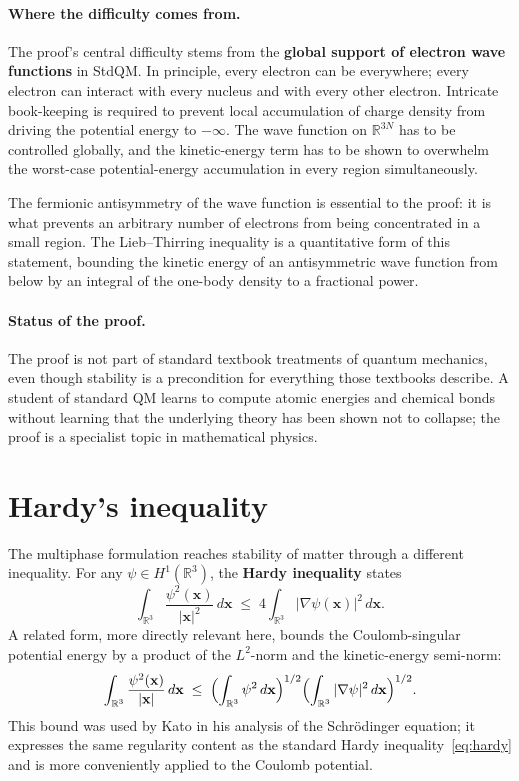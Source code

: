 \paragraph{Where the difficulty comes from.}
The proof's central difficulty stems from the \textbf{global support of electron wave functions} in StdQM. In principle, every electron can be everywhere; every electron can interact with every nucleus and with every other electron. Intricate book-keeping is required to prevent local accumulation of charge density from driving the potential energy to $-\infty$. The wave function on $\mathbb{R}^{3N}$ has to be controlled globally, and the kinetic-energy term has to be shown to overwhelm the worst-case potential-energy accumulation in every region simultaneously.

The fermionic antisymmetry of the wave function is essential to the proof: it is what prevents an arbitrary number of electrons from being concentrated in a small region. The Lieb--Thirring inequality is a quantitative form of this statement, bounding the kinetic energy of an antisymmetric wave function from below by an integral of the one-body density to a fractional power.

\paragraph{Status of the proof.}
The proof is not part of standard textbook treatments of quantum mechanics, even though stability is a precondition for everything those textbooks describe. A student of standard QM learns to compute atomic energies and chemical bonds without learning that the underlying theory has been shown not to collapse; the proof is a specialist topic in mathematical physics.

\section{Hardy's inequality}\label{sec:hardy}

The multiphase formulation reaches stability of matter through a different inequality. For any $\psi \in H^1(\mathbb{R}^3)$, the \textbf{Hardy inequality} states
\begin{equation}\label{eq:hardy}
\int_{\mathbb{R}^3} \frac{\psi^2(\mathbf{x})}{|\mathbf{x}|^2}\, d\mathbf{x}
\;\le\; 4 \int_{\mathbb{R}^3} |\nabla \psi(\mathbf{x})|^2\, d\mathbf{x}.
\end{equation}
A related form, more directly relevant here, bounds the Coulomb-singular potential energy by a product of the $L^2$-norm and the kinetic-energy semi-norm:
\begin{equation}\label{eq:hardy-kato}
\int_{\mathbb{R}^3} \frac{\psi^2(\mathbf{x})}{|\mathbf{x}|}\, d\mathbf{x}
\;\le\;
\Bigl(\int_{\mathbb{R}^3} \psi^2\, d\mathbf{x}\Bigr)^{1/2}
\Bigl(\int_{\mathbb{R}^3} |\nabla \psi|^2\, d\mathbf{x}\Bigr)^{1/2}.
\end{equation}
This bound was used by Kato in his analysis of the Schr\"odinger equation; it expresses the same regularity content as the standard Hardy inequality~\eqref{eq:hardy} and is more conveniently applied to the Coulomb potential.

